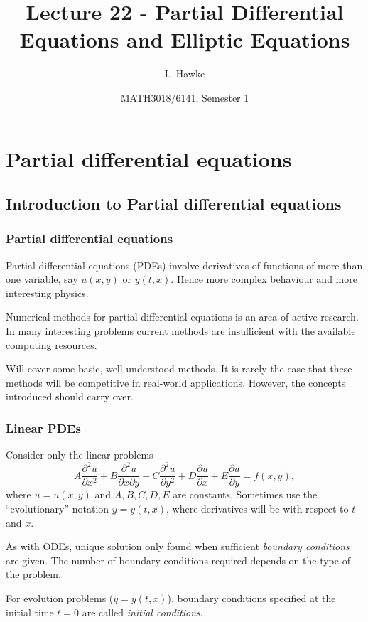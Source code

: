 \documentclass{beamer}
\title[Lecture 22] %
{Lecture 22 - Partial Differential Equations and Elliptic Equations}
\author[I. Hawke] %
{I.~Hawke}
\institute[University of Southampton] %
{
  School of Mathematics, \\
  University of Southampton, UK
}
\date[Semester 1] %
{MATH3018/6141, Semester 1}
\newcommand{\pda}[2]{\frac{\partial{#1}}{\partial{#2}}}
\newcommand{\pdb}[2]{\frac{\partial^2{#1}}{\partial{#2}^2}}
\newcommand{\pdc}[3]{\frac{\partial^2{#1}}{\partial{#2}\partial{#3}}}
\begin{document}
\begin{frame}
  \titlepage
\end{frame}

\section{Partial differential equations}

\subsection{Introduction to Partial differential equations}

\begin{frame}
  \frametitle{Partial differential equations}

  Partial differential equations (PDEs) involve derivatives of
  functions of more than one variable, say $u(x, y)$ or $y(t,
  x)$. Hence more complex behaviour and more interesting
  physics. \pause

  \vspace{1ex}

  Numerical methods for partial differential equations is an area of
  active research. In many interesting problems current methods are
  insufficient with the available computing resources. \pause

  \vspace{1ex}

  Will cover some basic, well-understood methods. It is rarely the
  case that these methods will be competitive in real-world
  applications. However, the concepts introduced should carry over.

\end{frame}

\begin{frame}
  \frametitle{Linear PDEs}

  Consider only the linear problems
  \begin{equation*}
    A \pdb{u}{x} + B \pdc{u}{x}{y} + C \pdb{u}{y} + D \pda{u}{x} + E
    \pda{u}{y} = f(x, y),
  \end{equation*}
  where $u = u(x, y)$ and $A,B,C,D,E$ are constants. \pause Sometimes
  use the ``evolutionary'' notation $y = y(t, x)$, where derivatives
  will be with respect to $t$ and $x$. \pause

  \vspace{1ex}

  As with ODEs, unique solution only found when sufficient
  \emph{boundary conditions} are given. The number of boundary
  conditions required depends on the type of the problem. \pause

  \vspace{1ex}

  For evolution problems ($y = y(t,x)$), boundary conditions specified
  at the initial time $t=0$ are called \emph{initial conditions}.

\end{frame}
\end{document}

